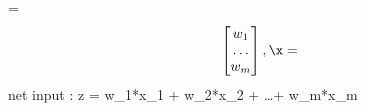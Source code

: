 \documentclass[11pt]{article}
\begin{document}
    \omega = $$ \left[
    \begin{matrix}
        w_1 \\
        \dots \\
        w_m \\
    \end{matrix}
        \right],
    \x = $$ 
    \newline
    \newline
    net input : z = w_1*x_1 + w_2*x_2 + \dots + w_m*x_m
\end{document}

